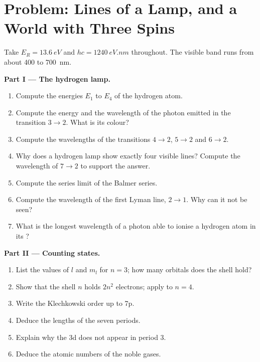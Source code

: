 \section{Problem: Lines of a Lamp, and a World with Three Spins}

\begin{problem}
\label{pb:b1:quantum-numbers:1}
Take $E_R = \qty{13.6}{eV}$ and $hc = \qty{1240}{eV.nm}$ throughout.
The visible band runs from about 400 to \qty{700}{nm}.

\medskip
\noindent\textbf{Part I --- The hydrogen lamp.}
\begin{enumerate}
  \item Compute the energies $E_1$ to $E_4$ of the hydrogen atom.
  \item Compute the energy and the wavelength of the photon emitted in
        the transition $3 \to 2$. What is its colour?
  \item Compute the wavelengths of the transitions $4 \to 2$, $5 \to 2$
        and $6 \to 2$.
  \item Why does a hydrogen lamp show exactly four visible lines?
        Compute the wavelength of $7 \to 2$ to support the answer.
  \item Compute the series limit of the Balmer series.
  \item Compute the wavelength of the first Lyman line, $2 \to 1$. Why can
        it not be seen?
  \item What is the longest wavelength of a photon able to ionise a
        hydrogen atom in its ?
\end{enumerate}

\medskip
\noindent\textbf{Part II --- Counting states.}
\begin{enumerate}[resume]
  \item List the values of $l$ and $m_l$ for $n = 3$; how many orbitals
        does the shell hold?
  \item Show that the shell $n$ holds $2n^2$ electrons; apply to $n = 4$.
  \item Write the Klechkowski order up to 7p.
  \item Deduce the lengths of the seven periods.
  \item Explain why the 3d  does not appear in period 3.
  \item Deduce the atomic numbers of the noble gases.
\end{enumerate}


\end{problem}
